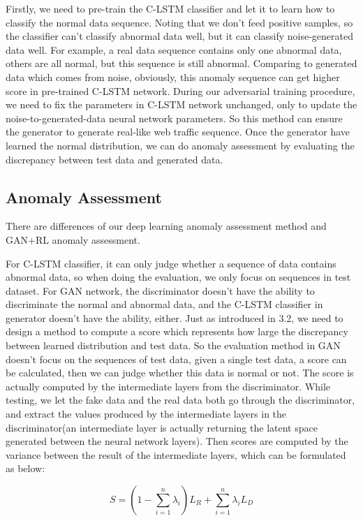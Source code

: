\documentclass{acmtog} %
\begin{document}
Firstly, we need to pre-train the C-LSTM classifier and let it to learn how to classify the normal data sequence. Noting that we don't feed positive samples, so the classifier can't classify abnormal data well, but it can classify noise-generated data well. For example, a real data sequence contains only one abnormal data, others are all normal, but this sequence is still abnormal. Comparing to generated data which comes from noise, obviously, this anomaly sequence can get higher score in pre-trained C-LSTM network. During our adversarial training procedure, we need to fix the parameters in C-LSTM network unchanged, only to update the noise-to-generated-data neural network parameters. So this method can ensure the generator to generate real-like web traffic sequence. Once the generator have learned the normal distribution, we can do anomaly assessment by evaluating the discrepancy between test data and generated data.

\subsection{Anomaly Assessment}
There are differences of our deep learning anomaly assessment method and GAN+RL anomaly assessment.

For C-LSTM classifier, it can only judge whether a sequence of data contains abnormal data, so when doing the evaluation,  we only focus on sequences in test dataset. For GAN network, the discriminator doesn't have the ability to discriminate the normal and abnormal data, and the C-LSTM classifier in generator doesn't have the ability, either. Just as introduced in 3.2, we need to design a method to compute a score which represents how large the discrepancy between learned distribution and test data. So the evaluation method in GAN doesn't focus on the sequences of test data, given a single test data, a score can be calculated, then we can judge whether this data is normal or not. The score is actually computed by the intermediate layers from the discriminator. While testing, we let the fake data and the real data both go through the discriminator, and extract the values produced by the intermediate layers in the discriminator(an intermediate layer is actually returning the latent space generated between the neural network layers). Then scores are computed by the variance between the result of the intermediate layers, which can be formulated as below:

\begin{equation}
S = (1 - \sum_{i=1}^{n}\lambda_i)L_R + \sum_{i=1}^{n}\lambda_i L_D
\end{equation}
\end{document}
